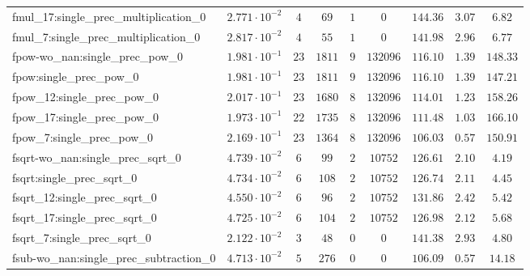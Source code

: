 \begin{tabular}{|l|c|c|c|c|c|c|c|c|}
fmul\_17:single\_prec\_multiplication\_0       & $ 2.771 \cdot 10^{-2} $ & $ 4      $ & $ 69    $ & $ 1   $ & $ 0      $ & $ 144.36      $ & $ 3.07    $ & $ 6.82    $ \\
fmul\_7:single\_prec\_multiplication\_0        & $ 2.817 \cdot 10^{-2} $ & $ 4      $ & $ 55    $ & $ 1   $ & $ 0      $ & $ 141.98      $ & $ 2.96    $ & $ 6.77    $ \\
fpow-wo\_nan:single\_prec\_pow\_0              & $ 1.981 \cdot 10^{-1} $ & $ 23     $ & $ 1811  $ & $ 9   $ & $ 132096 $ & $ 116.10      $ & $ 1.39    $ & $ 148.33  $ \\
fpow:single\_prec\_pow\_0                      & $ 1.981 \cdot 10^{-1} $ & $ 23     $ & $ 1811  $ & $ 9   $ & $ 132096 $ & $ 116.10      $ & $ 1.39    $ & $ 147.21  $ \\
fpow\_12:single\_prec\_pow\_0                  & $ 2.017 \cdot 10^{-1} $ & $ 23     $ & $ 1680  $ & $ 8   $ & $ 132096 $ & $ 114.01      $ & $ 1.23    $ & $ 158.26  $ \\
fpow\_17:single\_prec\_pow\_0                  & $ 1.973 \cdot 10^{-1} $ & $ 22     $ & $ 1735  $ & $ 8   $ & $ 132096 $ & $ 111.48      $ & $ 1.03    $ & $ 166.10  $ \\
fpow\_7:single\_prec\_pow\_0                   & $ 2.169 \cdot 10^{-1} $ & $ 23     $ & $ 1364  $ & $ 8   $ & $ 132096 $ & $ 106.03      $ & $ 0.57    $ & $ 150.91  $ \\
fsqrt-wo\_nan:single\_prec\_sqrt\_0            & $ 4.739 \cdot 10^{-2} $ & $ 6      $ & $ 99    $ & $ 2   $ & $ 10752  $ & $ 126.61      $ & $ 2.10    $ & $ 4.19    $ \\
fsqrt:single\_prec\_sqrt\_0                    & $ 4.734 \cdot 10^{-2} $ & $ 6      $ & $ 108   $ & $ 2   $ & $ 10752  $ & $ 126.74      $ & $ 2.11    $ & $ 4.45    $ \\
fsqrt\_12:single\_prec\_sqrt\_0                & $ 4.550 \cdot 10^{-2} $ & $ 6      $ & $ 96    $ & $ 2   $ & $ 10752  $ & $ 131.86      $ & $ 2.42    $ & $ 5.42    $ \\
fsqrt\_17:single\_prec\_sqrt\_0                & $ 4.725 \cdot 10^{-2} $ & $ 6      $ & $ 104   $ & $ 2   $ & $ 10752  $ & $ 126.98      $ & $ 2.12    $ & $ 5.68    $ \\
fsqrt\_7:single\_prec\_sqrt\_0                 & $ 2.122 \cdot 10^{-2} $ & $ 3      $ & $ 48    $ & $ 0   $ & $ 0      $ & $ 141.38      $ & $ 2.93    $ & $ 4.80    $ \\
fsub-wo\_nan:single\_prec\_subtraction\_0      & $ 4.713 \cdot 10^{-2} $ & $ 5      $ & $ 276   $ & $ 0   $ & $ 0      $ & $ 106.09      $ & $ 0.57    $ & $ 14.18   $ \\

\end{tabular}
